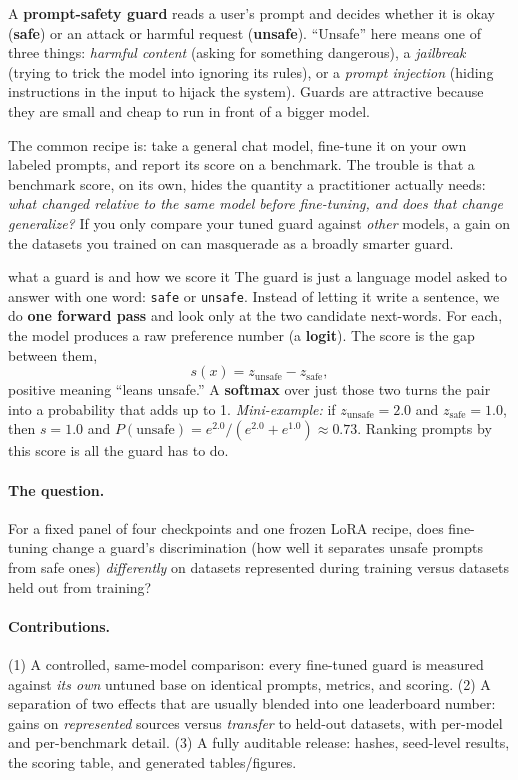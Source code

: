 \documentclass[11pt]{article}
\newcommand{\code}[1]{\texttt{\small #1}}
\begin{document}
A \textbf{prompt-safety guard} reads a user's prompt and decides whether it is okay
(\textbf{safe}) or an attack or harmful request (\textbf{unsafe}). ``Unsafe'' here means one
of three things: \emph{harmful content} (asking for something dangerous), a \emph{jailbreak}
(trying to trick the model into ignoring its rules), or a \emph{prompt injection} (hiding
instructions in the input to hijack the system). Guards are attractive because they are
small and cheap to run in front of a bigger model.

The common recipe is: take a general chat model, fine-tune it on your own labeled prompts,
and report its score on a benchmark. The trouble is that a benchmark score, on its own,
hides the quantity a practitioner actually needs: \emph{what changed relative to the same
model before fine-tuning, and does that change generalize?} If you only compare your tuned
guard against \emph{other} models, a gain on the datasets you trained on can masquerade as a
broadly smarter guard.

\begin{background}{what a guard is and how we score it}
\small
The guard is just a language model asked to answer with one word: \code{safe} or
\code{unsafe}. Instead of letting it write a sentence, we do \textbf{one forward pass} and
look only at the two candidate next-words. For each, the model produces a raw preference
number (a \textbf{logit}). The score is the gap between them,
\[
s(x) = z_{\text{unsafe}} - z_{\text{safe}},
\]
positive meaning ``leans unsafe.'' A \textbf{softmax} over just those two turns the pair into
a probability that adds up to 1. \emph{Mini-example:} if $z_{\text{unsafe}}=2.0$ and
$z_{\text{safe}}=1.0$, then $s=1.0$ and
$P(\text{unsafe}) = e^{2.0}/(e^{2.0}+e^{1.0}) \approx 0.73$. Ranking prompts by this score is
all the guard has to do.
\end{background}

\paragraph{The question.} For a fixed panel of four checkpoints and one frozen LoRA recipe,
does fine-tuning change a guard's discrimination (how well it separates unsafe prompts from
safe ones) \emph{differently} on datasets represented during training versus datasets held out
from training?

\paragraph{Contributions.} (1) A controlled, same-model comparison: every fine-tuned guard is
measured against \emph{its own} untuned base on identical prompts, metrics, and scoring.
(2) A separation of two effects that are usually blended into one leaderboard number: gains
on \emph{represented} sources versus \emph{transfer} to held-out datasets, with per-model and
per-benchmark detail. (3) A fully auditable release: hashes, seed-level results, the scoring
table, and generated tables/figures.
\end{document}
